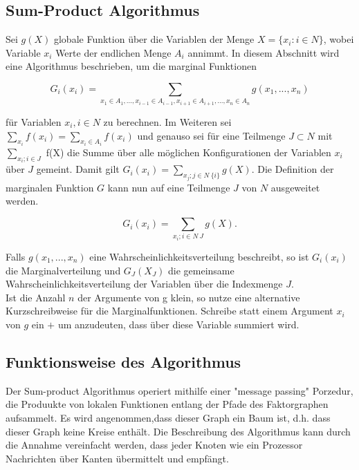 \documentclass[12pt,a4paper]{scrartcl}
\numberwithin{equation}{section}
\begin{document}
\subsection{Sum-Product Algorithmus}

Sei $g(X)$ globale Funktion über die Variablen der Menge $X = \{ x_i : i \in N \}$, wobei Variable $x_i$ Werte
der endlichen Menge $A_i$ annimmt.
In diesem Abschnitt wird eine Algorithmus beschrieben, um die marginal Funktionen 

\begin{equation}
 G_i(x_i) = \sum_{x_1 \in A_1,...,x_{i-1} \in A_{i-1},x_{i+1} \in A_{i+1},...,x_n \in A_n} g(x_1,...,x_n)
\end{equation}

für Variablen $x_i, i \in N $ zu berechnen. Im Weiteren sei $\sum_{x_i} f(x_i) = \sum_{x_i \in A_i} f(x_i)$ und genauso
sei für eine Teilmenge $J \subset N$ mit $\sum_{x_i; i \in J}$ f(X) die Summe über alle möglichen Konfigurationen der Variablen $x_i$
über $J$ gemeint. Damit gilt $G_i(x_i) = \sum_{x_j;j\in N \ \{i\}}g(X)$.
Die Definition der marginalen Funktion $G$ kann nun auf eine Teilmenge $J$ von $N$ ausgeweitet werden.

\begin{equation}
 G_i(x_i) = \sum_{x_i; i \in N \ J} g(X).
\end{equation}

Falls $g(x_1,...,x_n)$ eine Wahrscheinlichkeitsverteilung beschreibt, so ist $G_i(x_i)$ die Marginalverteilung und 
$G_{J}(X_J)$ die gemeinsame Wahrscheinlichkeitsverteilung der Variablen über die Indexmenge $J$.
\\
Ist die Anzahl $n$ der Argumente von g klein, so nutze eine alternative Kurzschreibweise für die Marginalfunktionen. 
Schreibe statt einem Argument $x_i$ von $g$ ein $+$ um anzudeuten, dass über diese Variable summiert wird.

\subsection{Funktionsweise des Algorithmus}

Der Sum-product Algorithmus operiert mithilfe einer "message passing" Porzedur, die Produukte von lokalen 
Funktionen entlang der Pfade des Faktorgraphen aufsammelt. Es wird angenommen,dass dieser Graph ein Baum ist, d.h.
dass dieser Graph keine Kreise enthält. Die Beschreibung des Algorithmus kann durch die Annahme vereinfacht werden, dass jeder Knoten wie ein
Prozessor Nachrichten über Kanten übermittelt und empfängt. \\
\end{document}
